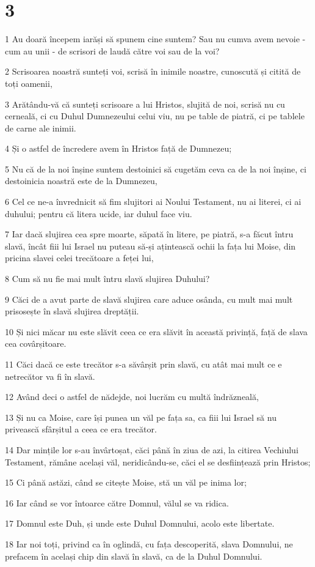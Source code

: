 \chapter{3}

\par 1 Au doară începem iarăși să spunem cine suntem? Sau nu cumva avem nevoie - cum au unii - de scrisori de laudă către voi sau de la voi?
\par 2 Scrisoarea noastră sunteți voi, scrisă în inimile noastre, cunoscută și citită de toți oamenii,
\par 3 Arătându-vă că sunteți scrisoare a lui Hristos, slujită de noi, scrisă nu cu cerneală, ci cu Duhul Dumnezeului celui viu, nu pe table de piatră, ci pe tablele de carne ale inimii.
\par 4 Și o astfel de încredere avem în Hristos față de Dumnezeu;
\par 5 Nu că de la noi înșine suntem destoinici să cugetăm ceva ca de la noi înșine, ci destoinicia noastră este de la Dumnezeu,
\par 6 Cel ce ne-a învrednicit să fim slujitori ai Noului Testament, nu ai literei, ci ai duhului; pentru că litera ucide, iar duhul face viu.
\par 7 Iar dacă slujirea cea spre moarte, săpată în litere, pe piatră, s-a făcut întru slavă, încât fiii lui Israel nu puteau să-și ațintească ochii la fața lui Moise, din pricina slavei celei trecătoare a feței lui,
\par 8 Cum să nu fie mai mult întru slavă slujirea Duhului?
\par 9 Căci de a avut parte de slavă slujirea care aduce osânda, cu mult mai mult prisosește în slavă slujirea dreptății.
\par 10 Și nici măcar nu este slăvit ceea ce era slăvit în această privință, față de slava cea covârșitoare.
\par 11 Căci dacă ce este trecător s-a săvârșit prin slavă, cu atât mai mult ce e netrecător va fi în slavă.
\par 12 Având deci o astfel de nădejde, noi lucrăm cu multă îndrăzneală,
\par 13 Și nu ca Moise, care își punea un văl pe fața sa, ca fiii lui Israel să nu privească sfârșitul a ceea ce era trecător.
\par 14 Dar mințile lor s-au învârtoșat, căci până în ziua de azi, la citirea Vechiului Testament, rămâne același văl, neridicându-se, căci el se desființează prin Hristos;
\par 15 Ci până astăzi, când se citește Moise, stă un văl pe inima lor;
\par 16 Iar când se vor întoarce către Domnul, vălul se va ridica.
\par 17 Domnul este Duh, și unde este Duhul Domnului, acolo este libertate.
\par 18 Iar noi toți, privind ca în oglindă, cu fața descoperită, slava Domnului, ne prefacem în același chip din slavă în slavă, ca de la Duhul Domnului.

